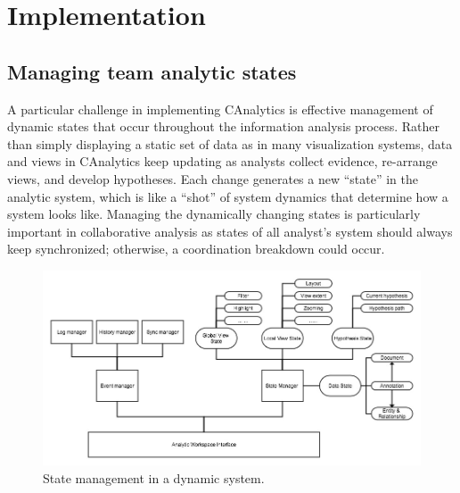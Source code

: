 \section{Implementation}

\subsection{Managing team analytic states}
% 


A particular challenge in implementing CAnalytics is effective management of dynamic states that occur throughout the information analysis process. Rather than simply displaying a static set of data as in many visualization systems, data and views in CAnalytics keep updating as analysts collect evidence, re-arrange views, and develop hypotheses. Each change generates a new ``state'' in the analytic system, which is like a ``shot'' of system dynamics that determine how a
system looks like. Managing the dynamically changing states is particularly important in collaborative analysis as states of all analyst's system should always keep synchronized; otherwise, a coordination breakdown could occur. 

\begin{figure}
	\centering
	\includegraphics[width=\columnwidth]{03-System/img/architecture.jpg}
	\caption{State management in a dynamic system.\label{fig:architecture}}
\end{figure}

